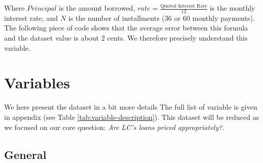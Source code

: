 \documentclass[11pt,]{report}
\newenvironment{Shaded}{\begin{snugshade}}{\end{snugshade}}
\newcommand{\DataTypeTok}[1]{\textcolor[rgb]{0.13,0.29,0.53}{#1}}
\newcommand{\DecValTok}[1]{\textcolor[rgb]{0.00,0.00,0.81}{#1}}
\newcommand{\KeywordTok}[1]{\textcolor[rgb]{0.13,0.29,0.53}{\textbf{#1}}}
\newcommand{\NormalTok}[1]{#1}
\newcommand{\OperatorTok}[1]{\textcolor[rgb]{0.81,0.36,0.00}{\textbf{#1}}}
\newcommand{\StringTok}[1]{\textcolor[rgb]{0.31,0.60,0.02}{#1}}
\begin{document}
Where \(Principal\) is the amount borrowed, \(rate = \frac{\text{Quoted Interest Rate}}{12}\) is the monthly interest rate, and \(N\) is the number of installments (36 or 60 monthly payments). The following piece of code shows that the average error between this formula and the dataset value is about 2 cents. We therefore precisely understand this variable.

\small

\begin{Shaded}
\end{Shaded}

\normalsize

\hypertarget{variables}{%
\section{Variables}\label{variables}}

We here present the dataset in a bit more details The full list of variable is given in appendix (see Table \ref{tab:variable-description}). This dataset will be reduced as we focused on our core question: \emph{Are LC's loans priced appropriately?}.

\hypertarget{general}{%
\subsection{General}\label{general}}
\end{document}
